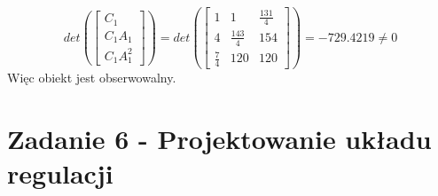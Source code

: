\documentclass{article}
\begin{document}
\[det(\begin{bmatrix}C_1 \\ C_1A_1 \\ C_1A^2_1\end{bmatrix}) = 
det(\begin{bmatrix} 1 & 1 & \frac{131}{4}\\ 4 & \frac{143}{4} & 154\\ \frac{7}{4} & 120 & 120 \end{bmatrix}) = -729.4219 \neq 0\]
Więc obiekt jest obserwowalny.

\section{Zadanie 6 - Projektowanie układu regulacji}
\end{document}
